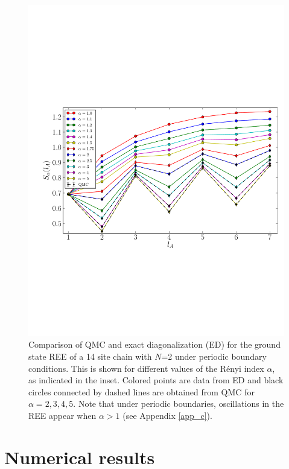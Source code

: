 \documentclass[aps,prb,reprint,floatfix]{revtex4-1}
\begin{document}
\begin{figure}[!t]
\centerline{\includegraphics[angle=0,width=0.95\columnwidth]{EDvsQMCsu2.pdf}}
\caption{Comparison of QMC and exact diagonalization (ED) for the ground state REE of a 14 site chain with $N$=2 under periodic boundary conditions. This is shown for different values of the R\'{e}nyi index $\alpha$, as indicated in the inset.  Colored points are data from ED and black circles connected by dashed lines are obtained from QMC for $\alpha=2,3,4,5$. Note that under periodic boundaries, oscillations in the REE appear when $\alpha>1$ (see Appendix \ref{app_c}).}
\label{fig:EDsu2}
\end{figure}

\section{Numerical results} 
\label{sec:data}
\end{document}
